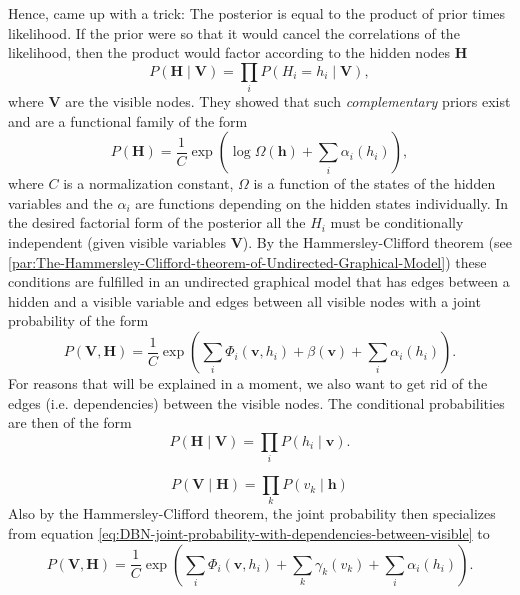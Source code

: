 Hence, \cite{HintonTeh2006} came up with a trick: The posterior is
equal to the product of prior times likelihood. If the prior were
so that it would cancel the correlations of the likelihood, then the
product would factor according to the hidden nodes $\mathbf{H}$ 
\[
P(\mathbf{H}\mid\mathbf{V})=\prod_{i}P(H_{i}=h_{i}\mid\mathbf{V}),
\]
 where $\mathbf{V}$ are the visible nodes. They showed that such
\emph{complementary }priors exist and
are a functional family of the form
\[
P(\mathbf{H})=\frac{1}{C}\exp\left(\log\Omega(\mathbf{h})+\sum_{i}\alpha_{i}(h_{i})\right),
\]
 where $C$ is a normalization constant, $\Omega$ is a function of
the states of the hidden variables and the $\alpha_{i}$ are functions
depending on the hidden states individually. In the desired factorial
form of the posterior all the $H_{i}$ must be conditionally independent
(given visible variables $\mathbf{V}$). By the Hammersley-Clifford
theorem (see \ref{par:The-Hammersley-Clifford-theorem-of-Undirected-Graphical-Model})
these conditions are fulfilled in an undirected graphical model that
has edges between a hidden and a visible variable and edges between
all visible nodes with a joint probability of the form
\begin{equation}
P(\mathbf{V},\mathbf{H})=\frac{1}{C}\exp\left(\sum_{i}\Phi_{i}(\mathbf{v},h_{i})+\beta(\mathbf{v})+\sum_{i}\alpha_{i}(h_{i})\right).\label{eq:DBN-joint-probability-with-dependencies-between-visible}
\end{equation}
For reasons that will be explained in a moment, we also want to get
rid of the edges (i.e. dependencies) between the visible nodes. The
conditional probabilities are then of the form
\begin{equation}
P(\mathbf{H}\mid\mathbf{V})=\prod_{i}P(h_{i}\mid\mathbf{v}).\label{eq:DBN-y-given-x}
\end{equation}

\begin{equation}
P(\mathbf{V}\mid\mathbf{H})=\prod_{k}P(v_{k}\mid\mathbf{h})\label{eq:DBN-x-given-y}
\end{equation}
Also by the Hammersley-Clifford theorem, the joint probability then
specializes from equation \ref{eq:DBN-joint-probability-with-dependencies-between-visible}
to
\[
P(\mathbf{V},\mathbf{H})=\frac{1}{C}\exp\left(\sum_{i}\Phi_{i}(\mathbf{v},h_{i})+\sum_{k}\gamma_{k}(v_{k})+\sum_{i}\alpha_{i}(h_{i})\right).
\]


